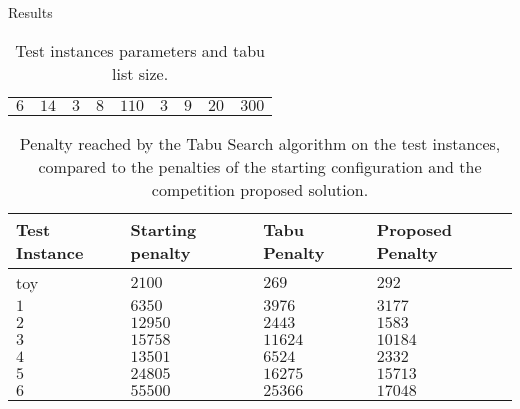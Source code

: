 \begin{section}{Results}
\begin{table}[h]
\begin{tabular}{lllllllll}
         $6$               & $14$          & $3$             & $8$                & $110$             & $3$                                                                   & $9$            & $20$            & $300$                   \\
     \end{tabular}
     \caption{Test instances parameters and tabu list size.}
     \label{tab:parameters}
 \end{table}
 \begin{table}[h]
     \centering
     \begin{tabular}{llll}
         \hline
         \textbf{Test Instance} & \textbf{Starting penalty} & \textbf{Tabu Penalty} & \textbf{Proposed Penalty} \\ \hline
         toy                    & $2100$                    & $269$                 & $292$                     \\
         $1$                    & $6350$                    & $3976$                & $3177$                    \\
         $2$                    & $12950$                   & $2443$                & $1583$                    \\
         $3$                    & $15758$                   & $11624$               & $10184$                   \\
         $4$                    & $13501$                   & $6524$                & $2332$                    \\
         $5$                    & $24805$                   & $16275$               & $15713$                   \\
         $6$                    & $55500$                   & $25366$               & $17048$                   \\
     \end{tabular}
     \caption{Penalty reached by the Tabu Search algorithm on the test instances, compared to the
         penalties of the starting configuration and the competition proposed solution.}
     \label{tab:penalties}
 \end{table}

\end{section}